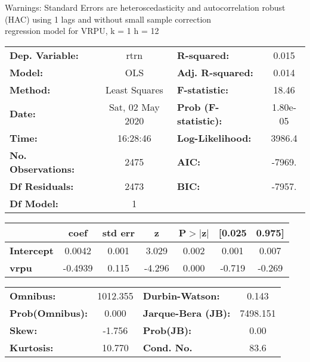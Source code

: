Warnings: \newline
 [1] Standard Errors are heteroscedasticity and autocorrelation robust (HAC) using 1 lags and without small sample correction\\ 

regression model for VRPU, k = 1 h = 12\begin{center}
\begin{tabular}{lclc}
\toprule
\textbf{Dep. Variable:}    &       rtrn       & \textbf{  R-squared:         } &     0.015   \\
\textbf{Model:}            &       OLS        & \textbf{  Adj. R-squared:    } &     0.014   \\
\textbf{Method:}           &  Least Squares   & \textbf{  F-statistic:       } &     18.46   \\
\textbf{Date:}             & Sat, 02 May 2020 & \textbf{  Prob (F-statistic):} &  1.80e-05   \\
\textbf{Time:}             &     16:28:46     & \textbf{  Log-Likelihood:    } &    3986.4   \\
\textbf{No. Observations:} &        2475      & \textbf{  AIC:               } &    -7969.   \\
\textbf{Df Residuals:}     &        2473      & \textbf{  BIC:               } &    -7957.   \\
\textbf{Df Model:}         &           1      & \textbf{                     } &             \\
\bottomrule
\end{tabular}
\begin{tabular}{lcccccc}
                   & \textbf{coef} & \textbf{std err} & \textbf{z} & \textbf{P$> |$z$|$} & \textbf{[0.025} & \textbf{0.975]}  \\
\midrule
\textbf{Intercept} &       0.0042  &        0.001     &     3.029  &         0.002        &        0.001    &        0.007     \\
\textbf{vrpu}      &      -0.4939  &        0.115     &    -4.296  &         0.000        &       -0.719    &       -0.269     \\
\bottomrule
\end{tabular}
\begin{tabular}{lclc}
\textbf{Omnibus:}       & 1012.355 & \textbf{  Durbin-Watson:     } &    0.143  \\
\textbf{Prob(Omnibus):} &   0.000  & \textbf{  Jarque-Bera (JB):  } & 7498.151  \\
\textbf{Skew:}          &  -1.756  & \textbf{  Prob(JB):          } &     0.00  \\
\textbf{Kurtosis:}      &  10.770  & \textbf{  Cond. No.          } &     83.6  \\
\bottomrule
\end{tabular}
\end{center}

